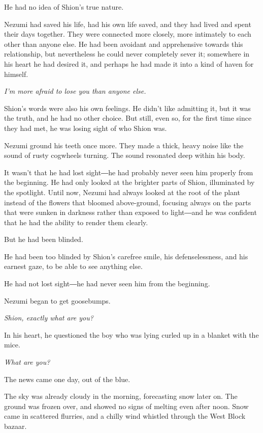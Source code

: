 He had no idea of Shion's true nature.

Nezumi had saved his life, had his own life saved, and they had lived
and spent their days together. They were connected more closely, more
intimately to each other than anyone else. He had been avoidant and
apprehensive towards this relationship, but nevertheless he could never
completely sever it; somewhere in his heart he had desired it, and
perhaps he had made it into a kind of haven for himself.

\emph{I'm more afraid to lose you than anyone else.}

Shion's words were also his own feelings. He didn't like admitting it,
but it was the truth, and he had no other choice. But still, even so,
for the first time since they had met, he was losing sight of who Shion
was.

Nezumi ground his teeth once more. They made a thick, heavy noise like
the sound of rusty cogwheels turning. The sound resonated deep within
his body.

It wasn't that he had lost sight―he had probably never seen him properly
from the beginning. He had only looked at the brighter parts of Shion,
illuminated by the spotlight. Until now, Nezumi had always looked at the
root of the plant instead of the flowers that bloomed above-ground,
focusing always on the parts that were sunken in darkness rather than
exposed to light―and he was confident that he had the ability to render
them clearly.

But he had been blinded.

He had been too blinded by Shion's carefree smile, his defenselessness,
and his earnest gaze, to be able to see anything else.

He had not lost sight―he had never seen him from the beginning.

Nezumi began to get goosebumps.

\emph{Shion, exactly what are you?}

In his heart, he questioned the boy who was lying curled up in a blanket
with the mice.

\emph{What are you?}

\myspace

The news came one day, out of the blue.

The sky was already cloudy in the morning, forecasting snow later on.
The ground was frozen over, and showed no signs of melting even after
noon. Snow came in scattered flurries, and a chilly wind whistled
through the West Block bazaar.

